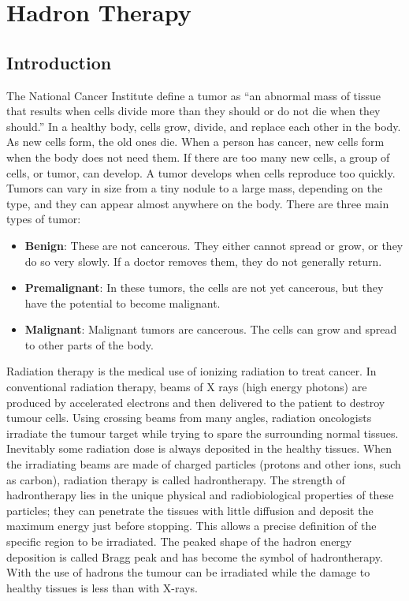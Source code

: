 \chapter{Hadron Therapy}

\section{Introduction}
The National Cancer Institute define a tumor\cite{tumor} as “an abnormal mass of tissue that results when cells divide more than they should or do not die when they should.”
In a healthy body, cells grow, divide, and replace each other in the body. As new cells form, the old ones die. When a person has cancer, new cells form when the body does not need them. If there are too many new cells, a group of cells, or tumor, can develop.
A tumor develops when cells reproduce too quickly. Tumors can vary in size from a tiny nodule to a large mass, depending on the type, and they can appear almost anywhere on the body.
There are three main types of tumor:
\begin{itemize}
\item \textbf{Benign}: These are not cancerous. They either cannot spread or grow, or they do so very slowly. If a doctor removes them, they do not generally return.
\item \textbf{Premalignant}: In these tumors, the cells are not yet cancerous, but they have the potential to become malignant.
\item \textbf{Malignant}: Malignant tumors are cancerous. The cells can grow and spread to other parts of the body.
\end{itemize}
Radiation therapy is the medical use of ionizing radiation to treat cancer. In conventional radiation therapy, beams of X rays (high energy photons) are produced by accelerated electrons and then delivered to the patient to destroy tumour cells. Using crossing beams from many angles, radiation oncologists irradiate the tumour target while trying to spare the surrounding normal tissues. Inevitably some radiation dose is always deposited in the healthy tissues.
When the irradiating beams are made of charged particles (protons and other ions, such as carbon), radiation therapy is called hadrontherapy\cite{radiationtherapy}. The strength of hadrontherapy lies in the unique physical and radiobiological properties of these particles; they can penetrate the tissues with little diffusion and deposit the maximum energy just before stopping. This allows a precise definition of the specific region to be irradiated. The peaked shape of the hadron energy deposition is called Bragg peak and has become the symbol of hadrontherapy. With the use of hadrons the tumour can be irradiated while the damage to healthy tissues is less than with X-rays.

